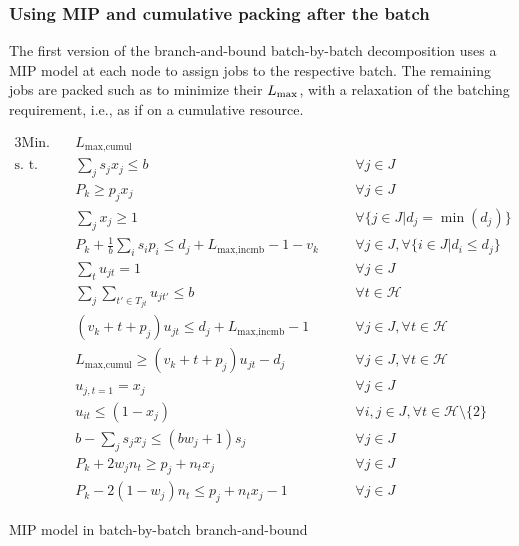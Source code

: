 \subsubsection{Using MIP and cumulative packing after the batch}

The first version of the branch-and-bound batch-by-batch decomposition uses a
MIP model at each node to assign jobs to the respective batch. The remaining
jobs are packed such as to minimize their $L_{\text{max}}$, with a relaxation of the
batching requirement, i.e., as if on a cumulative resource. 
\begin{model}[h!]
\begin{alignat}{3}
\text{Min.}\quad & L_{\text{max,cumul}} && \\ 
\text{s. t.}\quad & \label{dc:eq1} \sum_j s_j x_j \leq b \quad && \forall j \in J \\
& P_k \geq p_j x_j \quad && \forall j \in J \\
& \label{dc:eq3} \sum_j x_j \geq 1 \quad && \forall \{j \in J | d_j = \min(d_j)\} \\
& \label{dc:eq4} P_k + \frac{1}{b} \sum_{i} s_i p_i \leq d_j +
L_{\text{max,incmb}} - 1 - v_k \quad && \forall j \in J, \forall \{i \in J | d_i
\leq d_j\} \\[2ex]
& \label{dc:eq5} \sum_t u_{jt} = 1 \quad && \forall j \in J \\
& \label{dc:eq6} \sum_j \sum_{t' \in T_{jt}} u_{jt'} \leq b \quad && \forall t \in \mathcal{H} \\
& \label{dc:eq7} (v_k + t + p_j) u_{jt} \leq d_j + L_{\text{max,incmb}} - 1 \quad && \forall j \in J, \forall t \in \mathcal{H} \\
& \label{dc:eq8} L_{\text{max,cumul}} \geq (v_k + t + p_j) u_{jt} - d_j \quad && \forall j \in J, \forall t \in \mathcal{H} \\
& \label{dc:eq9} u_{j,t=1} = x_j \quad && \forall j \in J \\
& \label{dc:eq10} u_{it} \leq (1 - x_j) \quad && \forall i,j \in J, \forall t
\in \mathcal{H} \setminus \{2\} \\[2ex]
& \label{dc:eq11} b - \sum_j s_j x_j \leq (b w_j + 1) s_j \quad && \forall j \in J \\
& \label{dc:eq12} P_k + 2w_j n_t \geq p_j + n_t x_j \quad && \forall j \in J\\
& \label{dc:eq13} P_k - 2(1 - w_j)n_t \leq p_j +n_t x_j - 1 \quad && \forall j
\in J
\end{alignat}
\caption{MIP model in batch-by-batch branch-and-bound}
\label{model:decomp_mip}
\end{model}

